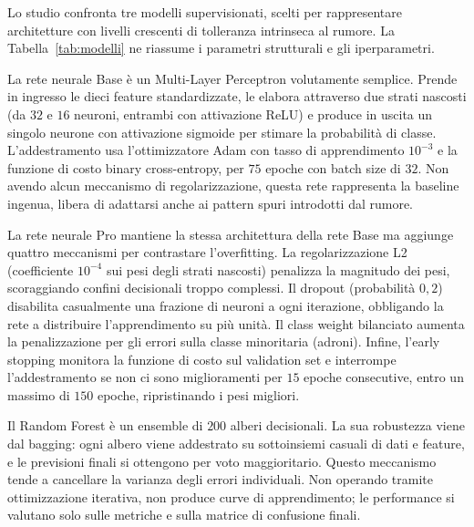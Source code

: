 \documentclass[12pt,a4paper]{article}
\begin{document}
Lo studio confronta tre modelli supervisionati, scelti per rappresentare architetture con livelli crescenti di tolleranza intrinseca al rumore. La Tabella~\ref{tab:modelli} ne riassume i parametri strutturali e gli iperparametri.

La rete neurale Base è un Multi-Layer Perceptron volutamente semplice. Prende in ingresso le dieci feature standardizzate, le elabora attraverso due strati nascosti (da $32$ e $16$ neuroni, entrambi con attivazione ReLU) e produce in uscita un singolo neurone con attivazione sigmoide per stimare la probabilità di classe. L'addestramento usa l'ottimizzatore Adam con tasso di apprendimento $10^{-3}$ e la funzione di costo binary cross-entropy, per $75$ epoche con batch size di $32$. Non avendo alcun meccanismo di regolarizzazione, questa rete rappresenta la baseline ingenua, libera di adattarsi anche ai pattern spuri introdotti dal rumore.

La rete neurale Pro mantiene la stessa architettura della rete Base ma aggiunge quattro meccanismi per contrastare l'overfitting. La regolarizzazione L2 (coefficiente $10^{-4}$ sui pesi degli strati nascosti) penalizza la magnitudo dei pesi, scoraggiando confini decisionali troppo complessi. Il dropout (probabilità $0{,}2$) disabilita casualmente una frazione di neuroni a ogni iterazione, obbligando la rete a distribuire l'apprendimento su più unità. Il class weight bilanciato aumenta la penalizzazione per gli errori sulla classe minoritaria (adroni). Infine, l'early stopping monitora la funzione di costo sul validation set e interrompe l'addestramento se non ci sono miglioramenti per $15$ epoche consecutive, entro un massimo di $150$ epoche, ripristinando i pesi migliori.

Il Random Forest è un ensemble di $200$ alberi decisionali. La sua robustezza viene dal bagging: ogni albero viene addestrato su sottoinsiemi casuali di dati e feature, e le previsioni finali si ottengono per voto maggioritario. Questo meccanismo tende a cancellare la varianza degli errori individuali. Non operando tramite ottimizzazione iterativa, non produce curve di apprendimento; le performance si valutano solo sulle metriche e sulla matrice di confusione finali.
\end{document}
